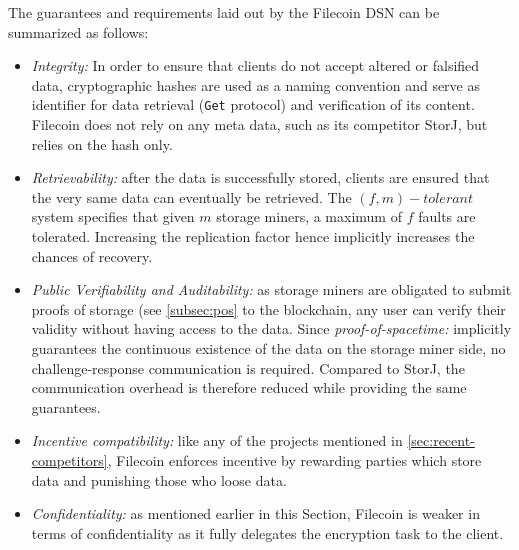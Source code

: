 \documentclass[journal]{IEEEtran}
\begin{document}
The guarantees and requirements laid out by the Filecoin DSN can be summarized as follows:
\begin{itemize}
\item \textit{Integrity:} In order to ensure that clients do not accept altered or falsified data, cryptographic hashes are used as a naming convention and serve as identifier for data retrieval (\texttt{Get} protocol) and verification of its content.
Filecoin does not rely on any meta data, such as its competitor StorJ\cite{storj}, but relies on the hash only.
\item \textit{Retrievability:} after the data is successfully stored, clients are ensured that the very same data can eventually be retrieved.
The $(f, m)-tolerant$ system specifies that given $m$ storage miners, a maximum of $f$ faults are tolerated.
Increasing the replication factor hence implicitly increases the chances of recovery.
\item \textit{Public Verifiability and Auditability:} as storage miners are obligated to submit proofs of storage (see \ref{subsec:pos} to the blockchain, any user can verify their validity without having access to the data.
Since \textit{proof-of-spacetime:} implicitly guarantees the continuous existence of the data on the storage miner side, no challenge-response communication is required.
Compared to StorJ\cite{storj}, the communication overhead is therefore reduced while providing the same guarantees.
\item \textit{Incentive compatibility:} like any of the projects mentioned in \ref{sec:recent-competitors}, Filecoin enforces incentive by rewarding parties which store data and punishing those who loose data.
\item \textit{Confidentiality:} as mentioned earlier in this Section, Filecoin is weaker in terms of confidentiality as it fully delegates the encryption task to the client.
\end{itemize}

\end{document}
